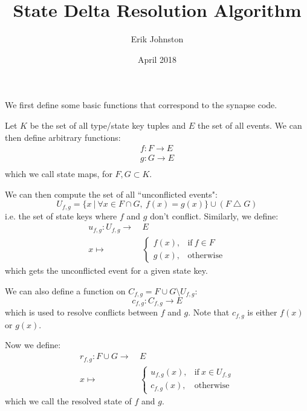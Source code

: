 \documentclass{article}
\title{State Delta Resolution Algorithm}
\author{Erik Johnston}
\date{April 2018}
\begin{document}
	
\maketitle
	
We first define some basic functions that correspond to the synapse code.

Let $K$ be the set of all type/state key tuples and $E$ the set of all events. We can then define arbitrary functions:
\begin{equation}
\begin{split}
f: F \rightarrow E\\
g: G \rightarrow E\\
\end{split}
\end{equation} which we call state maps, for $F, G \subset K$.

We can then compute the set of all ``unconflicted events":
\begin{equation}
U_{f,g} = \{x\ |\ \forall x \in F \cap G,\ f(x) = g(x)\} \cup (F \bigtriangleup G)
\end{equation} i.e. the set of state keys where $f$ and $g$ don't conflict. Similarly, we define:
\begin{equation}
\begin{split}
u_{f,g} : U_{f,g} \longrightarrow &\ E\\
x \longmapsto &\ \begin{cases}
	f(x), & \text{if}\ f \in F \\
	g(x), & \text{otherwise}
\end{cases}
\end{split}
\end{equation} which gets the unconflicted event for a given state key.


We can also define a function on $C_{f,g} = F \cup G \setminus U_{f,g}$:
\begin{equation}
c_{f,g}: C_{f,g} \rightarrow E
\end{equation} which is used to resolve conflicts between $f$ and $g$. Note that $c_{f,g}$ is either $f(x)$ or $g(x)$. 

Now we define:
\begin{equation} 
\begin{split}
r_{f,g}: F \cup G \longrightarrow &\ E\\
x \longmapsto &\ \begin{cases}
u_{f,g}(x), & \text{if}\ x \in U_{f,g}\\
c_{f,g}(x), & \text{otherwise}
\end{cases} 
\end{split}
\end{equation} which we call the resolved state of $f$ and $g$.
\end{document}
